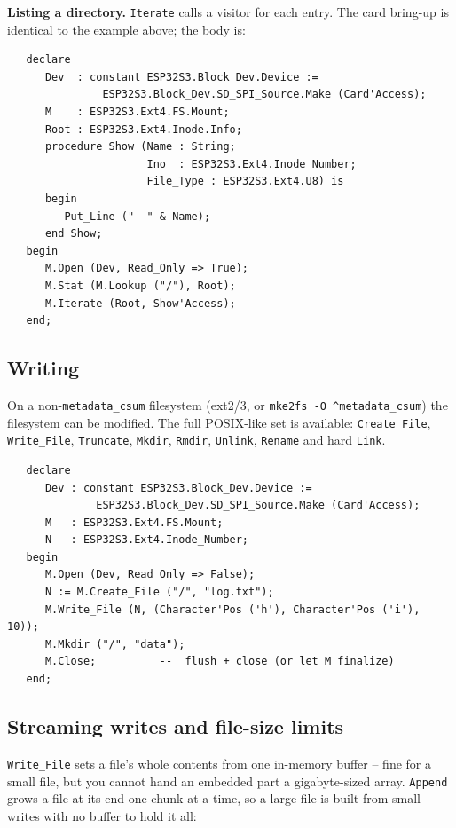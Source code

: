 \textbf{Listing a directory.} \texttt{Iterate} calls a visitor for each entry.
The card bring-up is identical to the example above; the body is:

\begin{lstlisting}
   declare
      Dev  : constant ESP32S3.Block_Dev.Device :=
               ESP32S3.Block_Dev.SD_SPI_Source.Make (Card'Access);
      M    : ESP32S3.Ext4.FS.Mount;
      Root : ESP32S3.Ext4.Inode.Info;
      procedure Show (Name : String;
                      Ino  : ESP32S3.Ext4.Inode_Number;
                      File_Type : ESP32S3.Ext4.U8) is
      begin
         Put_Line ("  " & Name);
      end Show;
   begin
      M.Open (Dev, Read_Only => True);
      M.Stat (M.Lookup ("/"), Root);
      M.Iterate (Root, Show'Access);
   end;
\end{lstlisting}

\subsection{Writing}

On a non-\texttt{metadata\_csum} filesystem (ext2/3, or
\texttt{mke2fs -O \textasciicircum metadata\_csum}) the filesystem can be modified.
The full POSIX-like set is available: \texttt{Create\_File}, \texttt{Write\_File},
\texttt{Truncate}, \texttt{Mkdir}, \texttt{Rmdir}, \texttt{Unlink},
\texttt{Rename} and hard \texttt{Link}.

\begin{lstlisting}
   declare
      Dev : constant ESP32S3.Block_Dev.Device :=
              ESP32S3.Block_Dev.SD_SPI_Source.Make (Card'Access);
      M   : ESP32S3.Ext4.FS.Mount;
      N   : ESP32S3.Ext4.Inode_Number;
   begin
      M.Open (Dev, Read_Only => False);
      N := M.Create_File ("/", "log.txt");
      M.Write_File (N, (Character'Pos ('h'), Character'Pos ('i'), 10));
      M.Mkdir ("/", "data");
      M.Close;          --  flush + close (or let M finalize)
   end;
\end{lstlisting}

\subsection{Streaming writes and file-size limits}

\texttt{Write\_File} sets a file's whole contents from one in-memory buffer --
fine for a small file, but you cannot hand an embedded part a gigabyte-sized
array. \texttt{Append} grows a file at its end one chunk at a time, so a large
file is built from small writes with no buffer to hold it all:

